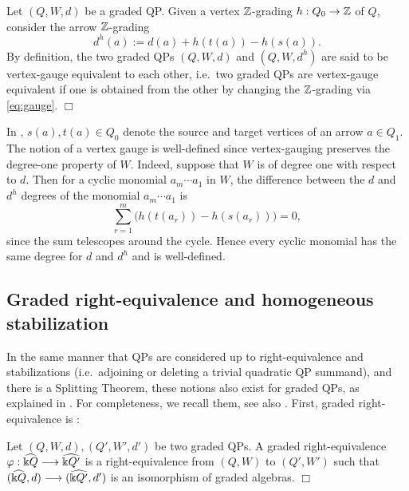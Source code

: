 \begin{definition}\label{def:vertex-gauge}
Let $(Q,W,d)$ be a graded QP. Given a vertex $\mathbb Z$-grading \(h:Q_0\to\mathbb Z\) of $Q$, consider the arrow $\mathbb Z$-grading
\begin{equation}\label{eq:gauge}
 d^h(a):=d(a)+h(t(a))-h(s(a)).
\end{equation}
By definition, the two graded QPs $(Q,W,d)$ and $(Q,W,d^h)$ are said to be vertex-gauge equivalent to each other, i.e.~two graded QPs are vertex-gauge equivalent if one is obtained from the
other by changing the $\mathbb Z$-grading via \eqref{eq:gauge}.
\hfill$\Box$\end{definition}

\noindent In , $s(a),t(a)\in Q_0$ denote the source and target vertices of an arrow $a\in Q_1$. The notion of a vertex gauge is well-defined since vertex-gauging preserves the degree-one property of $W$. Indeed, suppose that $W$ is of degree one with respect to $d$. Then for a cyclic monomial \(a_m\cdots a_1\) in $W$, the difference between the $d$ and $d^h$ degrees of the monomial $a_m\cdots a_1$ is
\[
 \sum_{r=1}^m\bigl(h(t(a_r))-h(s(a_r))\bigr)=0,
\]
since the sum telescopes around the cycle.  Hence every cyclic monomial has the same
degree for \(d\) and \(d^h\) and  is well-defined.\\

\subsection{Graded right-equivalence and homogeneous stabilization}

In the same manner that QPs are considered up to right-equivalence and stabilizations (i.e.~adjoining or deleting a trivial quadratic QP summand), and there is a Splitting Theorem, these notions also exist for graded QPs, as explained in \cite[Section 6.3]{AO}. For completeness, we recall them, see also \cite{Keller2026_GradedPreprint}. First, graded right-equivalence is \cite[Definition~6.5]{AO}:

\begin{definition}\label{def:graded-right-equivalence}
Let $(Q,W,d),(Q',W',d')$ be two graded QPs. A graded right-equivalence $\varphi:\widehat{\Bbbk Q}\longrightarrow\widehat{\Bbbk Q'}$ is a right-equivalence from $(Q,W)$ to $(Q',W')$ such that $(\widehat{\Bbbk Q},d)\longrightarrow(\widehat{\Bbbk Q'},d')$ is an isomorphism of graded algebras.
\hfill$\Box$\end{definition}

